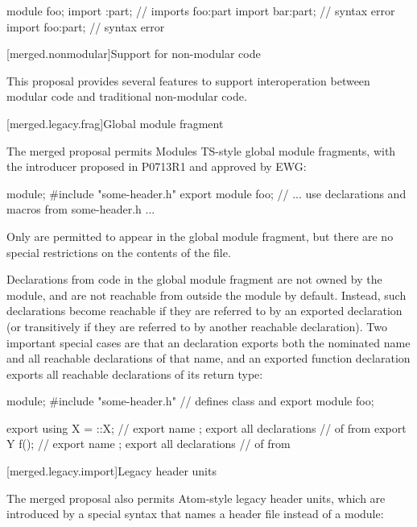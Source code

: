 \begin{codeblock}
module foo;
import :part;           // imports foo:part
import bar:part;        // syntax error
import foo:part;        // syntax error
\end{codeblock}

[merged.nonmodular]{Support for non-modular code}

\pnum
This proposal provides several features to support
interoperation between modular code
and traditional non-modular code.

[merged.legacy.frag]{Global module fragment}

\pnum
The merged proposal permits Modules TS-style global module fragments,
with the  introducer proposed in P0713R1
and approved by EWG:

\begin{codeblock}
module;
#include "some-header.h"
export module foo;
// ... use declarations and macros from some-header.h ...
\end{codeblock}

\pnum
Only  are permitted to appear
in the global module fragment,
but there are no special restrictions
on the contents of the  file.

\pnum
Declarations from code in the global module fragment
are not owned by the module,
and are not reachable from outside the module by default.
Instead, such declarations become reachable if they are referred to
by an exported declaration
(or transitively if they are referred to by another reachable declaration).
Two important special cases are that an 
declaration exports both the nominated name and
all reachable declarations of that name,
and an exported function declaration exports
all reachable declarations of its return type:

\begin{codeblock}
module;
#include "some-header.h" // defines class  and 
export module foo;

export using X = ::X; // export name ; export all declarations
                      // of  from 
export Y f(); // export name ; export all declarations
              // of  from 
\end{codeblock}

[merged.legacy.import]{Legacy header units}

\pnum
The merged proposal also permits Atom-style legacy header units,
which are introduced by a special  syntax
that names a header file instead of a module:

